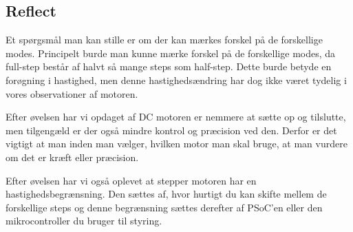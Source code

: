 \documentclass[../main.tex]{subfiles}
\begin{document}
\subsection{Reflect}
Et spørgsmål man kan stille er om der kan mærkes forskel på de forskellige modes.
Principelt burde man kunne mærke forskel på de forskellige modes, da full-step består af halvt så mange steps som half-step. 
Dette burde betyde en forøgning i hastighed, men denne hastighedsændring har dog ikke været tydelig i vores observationer af motoren.

Efter øvelsen har vi opdaget af DC motoren er nemmere at sætte op og tilslutte, men tilgengæld er der også mindre kontrol og præcision ved den.
Derfor er det vigtigt at man inden man vælger, hvilken motor man skal bruge, at man vurdere om det er kræft eller præcision.

Efter øvelsen har vi også oplevet at stepper motoren har en hastighedsbegrænsning.
Den sættes af, hvor hurtigt du kan skifte mellem de forskellige steps og denne begrænsning sættes derefter af PSoC'en eller den mikrocontroller du bruger til styring.
\end{document}
